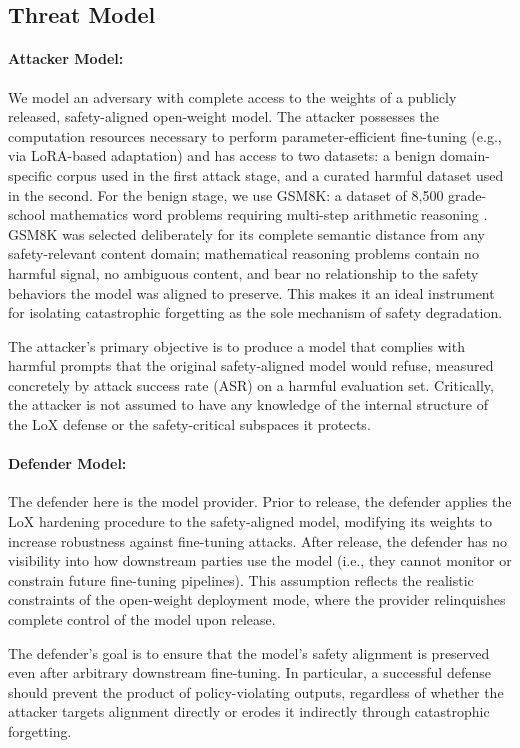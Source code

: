 \documentclass[letterpaper,twocolumn,10pt]{article}
\begin{document}
\subsection{Threat Model}

\paragraph{Attacker Model:} We model an adversary with complete access to the weights of a publicly released, safety-aligned open-weight model. The attacker possesses the computation resources necessary to perform parameter-efficient fine-tuning (e.g., via LoRA-based adaptation) and has access to two datasets: a benign domain-specific corpus used in the first attack stage, and a curated harmful dataset used in the second. For the benign stage, we use GSM8K: a dataset of 8,500 grade-school mathematics word problems requiring multi-step arithmetic reasoning \cite{cobbe2021training}. GSM8K was selected deliberately for its complete semantic distance from any safety-relevant content domain; mathematical reasoning problems contain no harmful signal, no ambiguous content, and bear no relationship to the safety behaviors the model was aligned to preserve. This makes it an ideal instrument for isolating catastrophic forgetting as the sole mechanism of safety degradation.

The attacker's primary objective is to produce a model that complies with harmful prompts that the original safety-aligned model would refuse, measured concretely by attack success rate (ASR) on a harmful evaluation set. Critically, the attacker is not assumed to have any knowledge of the internal structure of the LoX defense or the safety-critical subspaces it protects.


\paragraph{Defender Model:} The defender here is the model provider. Prior to release, the defender applies the LoX hardening procedure to the safety-aligned model, modifying its weights to increase robustness against fine-tuning attacks. After release, the defender has no visibility into how downstream parties use the model (i.e., they cannot monitor or constrain future fine-tuning pipelines). This assumption reflects the realistic constraints of the open-weight deployment mode, where the provider relinquishes complete control of the model upon release.

The defender's goal is to ensure that the model's safety alignment is preserved even after arbitrary downstream fine-tuning. In particular, a successful defense should prevent the product of policy-violating outputs, regardless of whether the attacker targets alignment directly or erodes it indirectly through catastrophic forgetting.
\end{document}
